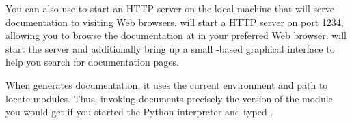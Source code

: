 You can also use  to start an HTTP server on the local
machine that will serve documentation to visiting Web browsers.
  will start a HTTP server on port
1234, allowing you to browse the documentation at
 in your preferred Web browser.
  will start the server and additionally
bring up a small -based graphical interface to help
you search for documentation pages.

When  generates documentation, it uses the current
environment and path to locate modules.  Thus, invoking
  documents precisely the version of
the module you would get if you started the Python interpreter and
typed .
